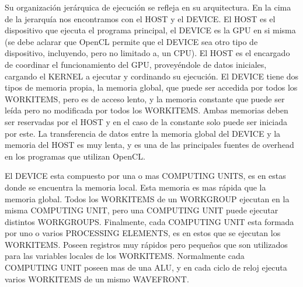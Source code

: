 Su organización jerárquica de ejecución se refleja en su arquitectura. En la
cima de la jerarquía nos encontramos con el HOST y el DEVICE. El HOST es el
dispositivo que ejecuta el programa principal, el DEVICE es la GPU en si misma
(se debe aclarar que OpenCL permite que el DEVICE sea otro tipo de dispositivo,
incluyendo, pero no limitado a, un CPU). El HOST es el encargado de coordinar el
funcionamiento del GPU, proveyéndole de datos iniciales, cargando el KERNEL a
ejecutar y cordinando su ejecución. El DEVICE tiene dos tipos de memoria propia,
la memoria global, que puede ser accedida por todos los WORKITEMS, pero es de
acceso lento, y la memoria constante que puede ser leída pero no modificada por
todos los WORKITEMS. Ambas memorias deben ser reservadas por el HOST y en el
caso de la constante solo puede ser iniciada por este. La transferencia de datos
entre la memoria global del DEVICE y la memoria del HOST es muy lenta, y es una
de las principales fuentes de overhead en los programas que utilizan OpenCL.

El DEVICE esta compuesto por una o mas COMPUTING UNITS, es en estas donde se
encuentra la memoria local. Esta memoria es mas rápida que la memoria global.
Todos los WORKITEMS de un WORKGROUP ejecutan en la misma COMPUTING UNIT, pero
una COMPUTING UNIT puede ejecutar distintos WORKGROUPS. Finalmente, cada
COMPUTING UNIT esta formada por uno o varios PROCESSING ELEMENTS, es en estos
que se ejecutan los WORKITEMS. Poseen registros muy rápidos pero pequeños que
son utilizados para las variables locales de los WORKITEMS. Normalmente cada
COMPUTING UNIT poseen mas de una ALU, y en cada ciclo de reloj ejecuta varios
WORKITEMS de un mismo WAVEFRONT.
